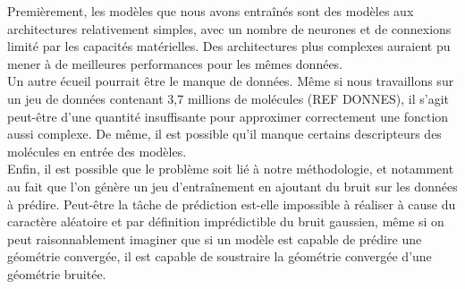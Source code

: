 \par Premièrement, les modèles que nous avons entraînés sont des modèles aux architectures relativement simples, avec un nombre de neurones et de connexions limité par les capacités matérielles. Des architectures plus complexes auraient pu mener à de meilleures performances pour les mêmes données. \\
Un autre écueil pourrait être le manque de données. Même si nous travaillons sur un jeu de données contenant 3,7 millions de molécules (REF DONNES), il s'agit peut-être d'une quantité insuffisante pour approximer correctement une fonction aussi complexe. De même, il est possible qu'il manque certains descripteurs des molécules en entrée des modèles.\\
Enfin, il est possible que le problème soit lié à notre méthodologie, et notamment au fait que l'on génère un jeu d'entraînement en ajoutant du bruit sur les données à prédire. Peut-être la tâche de prédiction est-elle impossible à réaliser à cause du caractère aléatoire et par définition imprédictible du bruit gaussien, même si on peut raisonnablement imaginer que si un modèle est capable de prédire une géométrie convergée, il est capable de soustraire la géométrie convergée d'une géométrie bruitée.